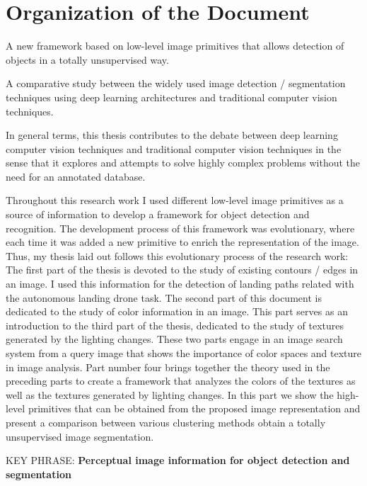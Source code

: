 \section{Organization of the Document}
A new framework based on low-level image primitives that allows detection of objects in a totally unsupervised way.

A comparative study between the widely used image detection / segmentation techniques using deep learning architectures and traditional computer vision techniques.

In general terms, this thesis contributes to the debate between deep learning computer vision techniques and traditional computer vision techniques in the sense that it explores and attempts to solve highly complex problems without the need for an annotated database.


Throughout this research work I used different low-level image primitives as a source of information to develop a framework for object detection and recognition. The development process of this framework was evolutionary, where each time it was added a new primitive to enrich the representation of the image. Thus, my thesis laid out follows this evolutionary process of the research work: The first part of the thesis is devoted to the study of existing contours / edges in an image. I used this information for the detection of landing paths related with the autonomous landing drone task. The second part of this document is dedicated to the study of color information in an image. This part serves as an introduction to the third part of the thesis, dedicated to the study of textures generated by the lighting changes. These two parts engage in an image search system from a query image that shows the importance of color spaces and texture in image analysis. Part number four brings together the theory used in the preceding parts to create a framework that analyzes the colors of the textures as well as the textures generated by lighting changes. In this part we show the high-level primitives that can be obtained from the proposed image representation and present a comparison between various clustering methods obtain a totally unsupervised image segmentation.


KEY PHRASE: \textbf{Perceptual image information for object detection and segmentation}



